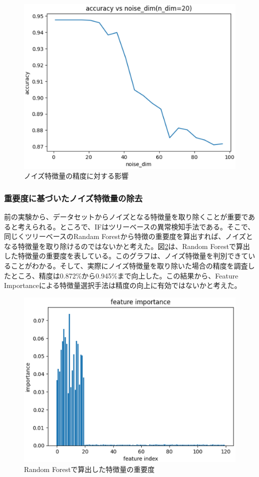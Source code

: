 \documentclass{css}
\begin{document}
\begin{figure}[ht]
    \centering
    \includegraphics[width=\linewidth]{pictures/eps/noise_accu.eps}
    \caption{ノイズ特徴量の精度に対する影響}
    \label{fig:noise_accu}
\end{figure}

\subsubsection{重要度に基づいたノイズ特徴量の除去}
前の実験から、データセットからノイズとなる特徴量を取り除くことが重要であると考えられる。ところで、IFはツリーベースの異常検知手法である。そこで、同じくツリーベースのRandam Forestから特徴の重要度を算出すれば、ノイズとなる特徴量を取り除けるのではないかと考えた。図\ref{fig:select_noise}は、Random Forestで算出した特徴量の重要度を表している。このグラフは、ノイズ特徴量を判別できていることがわかる。そして、実際にノイズ特徴量を取り除いた場合の精度を調査したところ、精度は0.872\%から0.945\%まで向上した。この結果から、Feature Importanceによる特徴量選択手法は精度の向上に有効ではないかと考えた。

\begin{figure}[ht]
    \centering
    \includegraphics[width=\linewidth]{pictures/eps/select_noise.eps}
    \caption{Random Forestで算出した特徴量の重要度}
    \label{fig:select_noise}
\end{figure}
\end{document}
